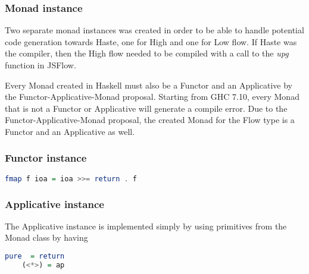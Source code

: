 \subsubsection{Monad instance}
Two separate monad instances was created in order to be able to handle potential code generation towards Haste, one for High and one for Low flow. If Haste was the compiler, then the High flow needed to be compiled with a call to the \emph{upg} function in JSFlow.

Every Monad created in Haskell must also be a Functor and an Applicative by the Functor-Applicative-Monad proposal\cite{functor_applicative_monad}. Starting from GHC 7.10, every Monad that is not a Functor or Applicative will generate a compile error. Due to the Functor-Applicative-Monad proposal, the created Monad for the Flow type is a Functor and an Applicative as well.

\subsubsection{Functor instance}
\begin{center}
  \begin{lstlisting}[language=Haskell]
    fmap f ioa = ioa >>= return . f
  \end{lstlisting}
\end{center}

\subsubsection{Applicative instance}
The Applicative instance is implemented simply by using primitives from the Monad class by having
\begin{center}
  \begin{lstlisting}[language=Haskell]
    pure  = return
    (<*>) = ap
  \end{lstlisting}
\end{center}

